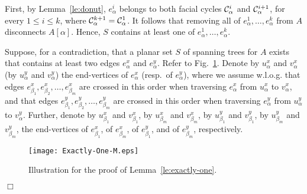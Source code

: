 \documentclass[letter,runningheads]{llncs}
\renewenvironment{proof}
{{\em Proof.\ }}{\hspace*{\fill}$\Box$\par\vspace{2mm}}
\begin{document}
\begin{proof}
First, by Lemma~\ref{le:donut}, $e^i_\alpha$ belongs to both facial cycles ${\cal C}^i_\alpha$ and ${\cal C}^{i+1}_\alpha$, for every $1\leq i\leq k$, where ${\cal C}^{k+1}_\alpha={\cal C}^{1}_\alpha$. It follows that removing all of $e^1_\alpha,\dots,e^{k}_\alpha$ from $A$ disconnects $A[\alpha]$. Hence, $S$ contains at least one of $e^1_\alpha,\dots,e^{k}_\alpha$.

Suppose, for a contradiction, that a planar set $S$ of spanning trees for $A$ exists that contains at least two edges $e^x_\alpha$ and $e^y_\alpha$. Refer to Fig.~\ref{fig:exactly-one}. Denote by $u^x_\alpha$ and $v^x_\alpha$ (by $u^y_\alpha$ and $v^y_\alpha$) the end-vertices of $e^x_\alpha$ (resp.\ of $e^y_\alpha$), where we assume w.l.o.g. that edges $e^x_{\beta_1},e^x_{\beta_2},\dots,e^x_{\beta_m}$ are crossed in this order when traversing $e^x_\alpha$ from $u^x_\alpha$ to $v^x_\alpha$, and that edges $e^y_{\beta_1},e^y_{\beta_2},\dots,e^y_{\beta_m}$ are crossed in this order when traversing $e^y_\alpha$ from $u^y_\alpha$ to $v^y_\alpha$. Further, denote by $u^x_{\beta_1}$ and $v^x_{\beta_1}$, by $u^x_{\beta_m}$ and $v^x_{\beta_m}$, by $u^y_{\beta_1}$ and $v^y_{\beta_1}$, by $u^y_{\beta_m}$ and $v^y_{\beta_m}$,  the end-vertices of $e^x_{\beta_1}$, of $e^x_{\beta_m}$, of $e^y_{\beta_1}$, and of $e^y_{\beta_m}$, respectively.


\begin{figure}[tb]
\begin{center}
\mbox{\texttt{[image: Exactly-One-M.eps]}}
\caption{Illustration for the proof of Lemma~\ref{le:exactly-one}.}
\label{fig:exactly-one}
\end{center}
\end{figure}


\end{proof}
\end{document}
